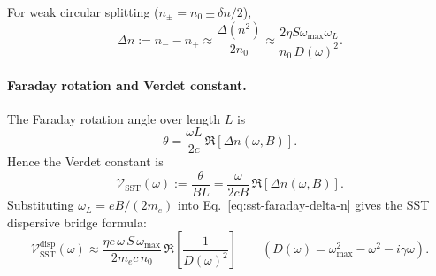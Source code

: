 \documentclass[10pt]{article}
\begin{document}
            For weak circular splitting (\(n_\pm=n_0\pm \delta n/2\)),
            \begin{equation}
                \Delta n:=n_- - n_+
                \approx
                \frac{\Delta(n^2)}{2n_0}
                \approx
                \frac{2\eta S\omega_{\max}\omega_L}{n_0\,D(\omega)^2}.
                \label{eq:sst-faraday-delta-n}
            \end{equation}

        \paragraph{Faraday rotation and Verdet constant.}
            The Faraday rotation angle over length \(L\) is
            \begin{equation}
                \theta=\frac{\omega L}{2c}\,\Re\!\left[\Delta n(\omega,B)\right].
                \label{eq:sst-faraday-theta}
            \end{equation}
            Hence the Verdet constant is
            \begin{equation}
                \mathcal{V}_{\mathrm{SST}}(\omega)
                :=\frac{\theta}{BL}
                =
                \frac{\omega}{2cB}\,\Re\!\left[\Delta n(\omega,B)\right].
                \label{eq:sst-faraday-verdet-def}
            \end{equation}
            Substituting \(\omega_L=eB/(2m_e)\) into Eq.~\eqref{eq:sst-faraday-delta-n} gives the SST dispersive bridge formula:
            \begin{equation}
                \boxed{
                    \mathcal{V}_{\mathrm{SST}}^{\mathrm{disp}}(\omega)
                    \approx
                    \frac{\eta e\,\omega\,S\,\omega_{\max}}{2m_e c\,n_0}\,
                    \Re\!\left[\frac{1}{D(\omega)^2}\right]
                }
                \qquad
                \left(D(\omega)=\omega_{\max}^2-\omega^2-i\gamma\omega\right).
                \label{eq:sst-faraday-verdet-disp}
            \end{equation}
\end{document}
